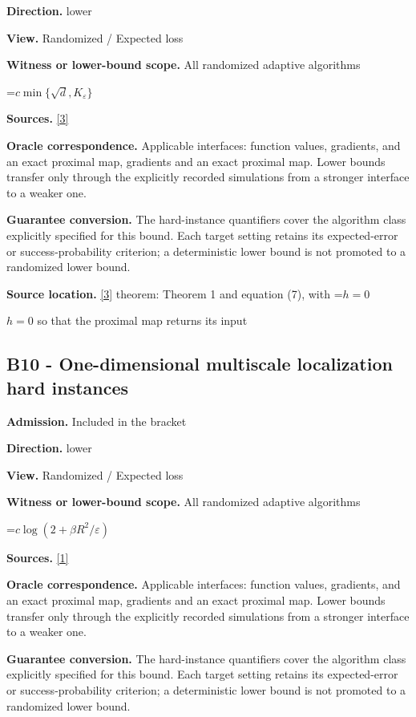 \documentclass[10pt,a4paper]{article}
\newcommand{\AtlasMath}[1]{\par\begingroup\centering\setbox0=\hbox{$\displaystyle #1$}\ifdim\wd0>1.4\linewidth\typeout{ATLAS WIDE FORMULA: \the\wd0}\fi\ifdim\wd0>\linewidth\resizebox{\linewidth}{!}{\box0}\else\box0\fi\par\endgroup}
\newcommand{\AtlasInlineMath}[1]{\begingroup\setbox0=\hbox{$#1$}\ifdim\wd0>.4\linewidth\endgroup\AtlasMath{#1}\else\endgroup$#1$\fi}
\begin{document}
\textbf{Direction.} lower

\textbf{View.} Randomized / Expected loss

\textbf{Witness or lower-bound scope.} All randomized adaptive algorithms

\AtlasMath{c\min\{\sqrt d,K_\varepsilon\}}
\textbf{Sources.} \href{https://arxiv.org/pdf/2609.10874}{[3]}

\textbf{Oracle correspondence.} Applicable interfaces: function values, gradients, and an exact proximal map, gradients and an exact proximal map. Lower bounds transfer only through the explicitly recorded simulations from a stronger interface to a weaker one.

\textbf{Guarantee conversion.} The hard-instance quantifiers cover the algorithm class explicitly specified for this bound. Each target setting retains its expected-error or success-probability criterion; a deterministic lower bound is not promoted to a randomized lower bound.

\textbf{Source location.} \href{https://arxiv.org/pdf/2609.10874}{[3]} theorem: Theorem 1 and equation (7), with \AtlasInlineMath{h=0} so that the proximal map returns its input

\subsection{B10 - One-dimensional multiscale localization hard instances}
\textbf{Admission.} Included in the bracket

\textbf{Direction.} lower

\textbf{View.} Randomized / Expected loss

\textbf{Witness or lower-bound scope.} All randomized adaptive algorithms

\AtlasMath{c\log(2+\beta R^2/\varepsilon)}
\textbf{Sources.} \href{https://www.tau.ac.il/~becka/FISTA.pdf}{[1]}

\textbf{Oracle correspondence.} Applicable interfaces: function values, gradients, and an exact proximal map, gradients and an exact proximal map. Lower bounds transfer only through the explicitly recorded simulations from a stronger interface to a weaker one.

\textbf{Guarantee conversion.} The hard-instance quantifiers cover the algorithm class explicitly specified for this bound. Each target setting retains its expected-error or success-probability criterion; a deterministic lower bound is not promoted to a randomized lower bound.
\end{document}
